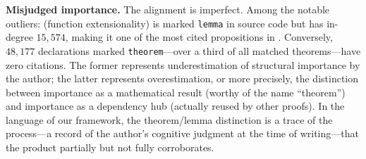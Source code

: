 \noindent\textbf{Misjudged importance.}
\label{rem:misjudged}
The alignment is imperfect. Among the notable outliers:  (function extensionality) is marked \texttt{lemma} in source code but has in-degree $15{,}574$, making it one of the most cited propositions in . Conversely, $48{,}177$ declarations marked \texttt{theorem}---over a third of all matched theorems---have zero citations. The former represents underestimation of structural importance by the author; the latter represents overestimation, or more precisely, the distinction between importance as a mathematical result (worthy of the name ``theorem'') and importance as a dependency hub (actually reused by other proofs). In the language of our framework, the theorem/lemma distinction is a trace of the process---a record of the author's cognitive judgment at the time of writing---that the product partially but not fully corroborates.

